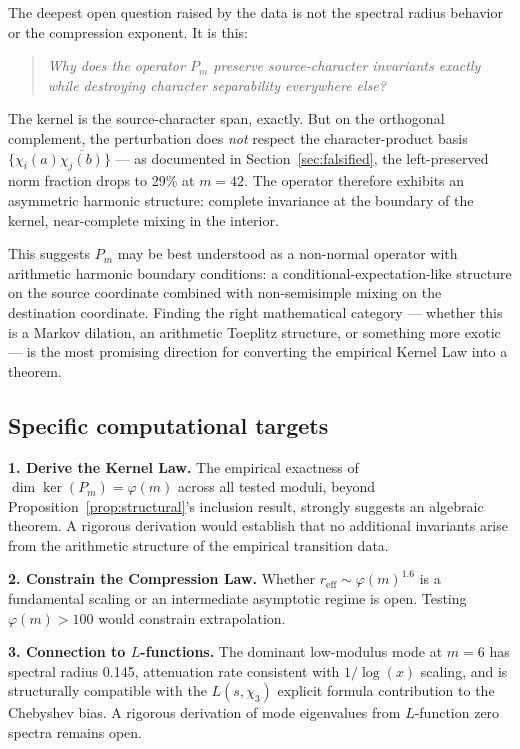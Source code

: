 \documentclass[11pt,a4paper]{article}
\begin{document}
The deepest open question raised by the data is not the spectral radius behavior or the compression exponent. It is this:

\begin{quote}
\emph{Why does the operator $P_m$ preserve source-character invariants exactly while destroying character separability everywhere else?}
\end{quote}

The kernel is the source-character span, exactly. But on the orthogonal complement, the perturbation does \emph{not} respect the character-product basis $\{\chi_i(a) \overline{\chi_j(b)}\}$ --- as documented in Section~\ref{sec:falsified}, the left-preserved norm fraction drops to 29\% at $m = 42$. The operator therefore exhibits an asymmetric harmonic structure: complete invariance at the boundary of the kernel, near-complete mixing in the interior.

This suggests $P_m$ may be best understood as a non-normal operator with arithmetic harmonic boundary conditions: a conditional-expectation-like structure on the source coordinate combined with non-semisimple mixing on the destination coordinate. Finding the right mathematical category --- whether this is a Markov dilation, an arithmetic Toeplitz structure, or something more exotic --- is the most promising direction for converting the empirical Kernel Law into a theorem.

\subsection{Specific computational targets}

\textbf{1. Derive the Kernel Law.} The empirical exactness of $\dim \ker(P_m) = \varphi(m)$ across all tested moduli, beyond Proposition~\ref{prop:structural}'s inclusion result, strongly suggests an algebraic theorem. A rigorous derivation would establish that no additional invariants arise from the arithmetic structure of the empirical transition data.

\textbf{2. Constrain the Compression Law.} Whether $r_{\text{eff}} \sim \varphi(m)^{1.6}$ is a fundamental scaling or an intermediate asymptotic regime is open. Testing $\varphi(m) > 100$ would constrain extrapolation.

\textbf{3. Connection to $L$-functions.} The dominant low-modulus mode at $m = 6$ has spectral radius 0.145, attenuation rate consistent with $1/\log(x)$ scaling, and is structurally compatible with the $L(s, \chi_3)$ explicit formula contribution to the Chebyshev bias. A rigorous derivation of mode eigenvalues from $L$-function zero spectra remains open.
\end{document}
